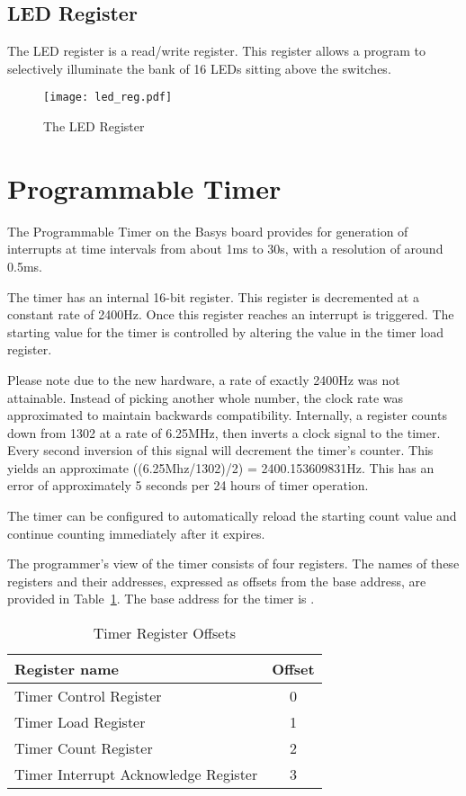 \subsection{LED Register}

The LED register is a read/write register. This
register allows a program to selectively illuminate the bank of 16 LEDs
sitting above the switches.

\begin{figure}[h]
\begin{center}
\texttt{[image: led\_reg.pdf]}
\caption{The LED Register}
\label{LED_pic}
\end{center}
\end{figure}

\section{Programmable Timer}

The Programmable Timer on the Basys board provides for generation of
interrupts at time intervals from about 1ms to 30s, with a resolution
of around 0.5ms.

The timer has an internal 16-bit register. This register is decremented
at a constant rate of 2400Hz. Once this register reaches
 an interrupt is triggered. The starting value for the
timer is controlled by altering the value in the timer load register.

Please note due to the new hardware, a rate of exactly 2400Hz was not attainable.
Instead of picking another whole number, the clock rate was approximated
to maintain backwards compatibility. Internally, a register counts down from 1302 
at a rate of 6.25MHz, then inverts a clock signal to the timer.
Every second inversion of this signal will decrement the timer's counter.
This yields an approximate ((6.25Mhz/1302)/2) = 2400.153609831Hz.
This has an error of approximately 5 seconds per 24 hours of timer operation.

The timer can be configured to automatically reload the starting count
value and continue counting immediately after it expires.

The programmer's view of the timer consists of four registers.  The
names of these registers and their addresses, expressed as offsets
from the base address, are provided in
Table~\ref{table:timer_offsets}.  The base address for the timer is
\src{\LOCTIMEBASE}.

\begin{table}[h]
\begin{center}
\begin{tabular}{|l|c|}
\hline
\textbf{Register name} & \textbf{Offset} \\
\hline
Timer Control Register & 0 \\
\hline
Timer Load Register & 1 \\
\hline
Timer Count Register & 2 \\
\hline
Timer Interrupt Acknowledge Register & 3 \\
\hline
\end{tabular}
\caption{Timer Register Offsets}
\label{table:timer_offsets}
\end{center}
\end{table}

